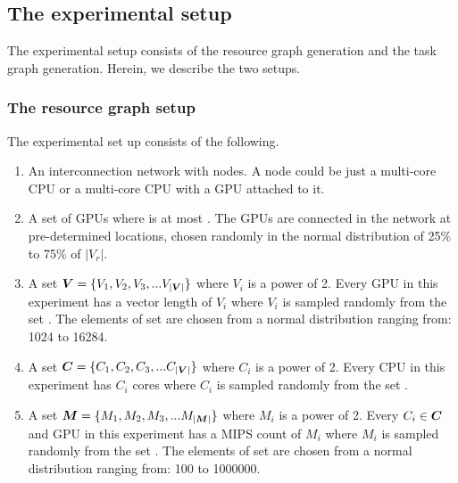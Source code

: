 \subsection{The experimental setup}
\label{sec:experimental-setup}

The experimental setup consists of the resource graph generation and the
task graph generation. Herein, we describe the two setups.

\subsubsection{The resource graph setup}
\label{sec:resource-graph-setup}

The experimental set up consists of the following.

\begin{enumerate}

\item  An interconnection network with \numtplgynodes nodes. A node
could be just a multi-core CPU or a multi-core CPU with a GPU attached to it.

\item A set of \gpunum GPUs where \gpunum is at most \numtplgynodes. The
  GPUs are connected in the network at pre-determined locations, chosen
  randomly in the normal distribution of 25\% to 75\% of $|V_r|$.

\item A set $\bm{V} = \{V_1, V_2, V_3, ... V_{|\bm{V}|}\}$ where
  $V_i$ is a power of 2.  Every GPU in this experiment has a vector
  length of $V_i$ where $V_i$ is sampled randomly from the set
  \veclenset. The elements of set \veclenset are chosen from a normal
  distribution ranging from: 1024 to 16284.

\item A set $\bm{C} = \{C_1, C_2, C_3, ... C_{|\bm{V}|}\}$
  where $C_i$ is a power of 2.  Every CPU in this experiment has $C_i$
  cores where $C_i$ is sampled randomly from the set \corenumset.

\item A set $\bm{M} = \{M_1, M_2, M_3, ... M_{|\bm{M}|}\}$ where
  $M_i$ is a power of 2.  Every $C_i \in \bm{C}$ and GPU in this
  experiment has a MIPS count of $M_i$ where $M_i$ is sampled randomly
  from the set \mipsset. The elements of set \mipsset are chosen from a
  normal distribution ranging from: 100 to 1000000.

\end{enumerate}

